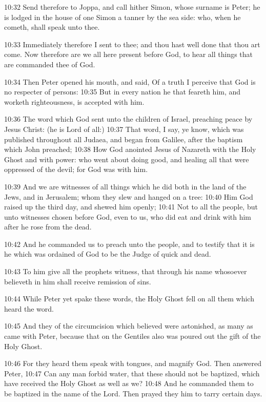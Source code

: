 10:32 Send therefore to Joppa, and call hither Simon, whose surname is Peter; he is lodged in the house of one Simon a tanner by the sea side: who, when he cometh, shall speak unto thee.

10:33 Immediately therefore I sent to thee; and thou hast well done that thou art come. Now therefore are we all here present before God, to hear all things that are commanded thee of God.

10:34 Then Peter opened his mouth, and said, Of a truth I perceive that God is no respecter of persons: 10:35 But in every nation he that feareth him, and worketh righteousness, is accepted with him.

10:36 The word which God sent unto the children of Israel, preaching peace by Jesus Christ: (he is Lord of all:) 10:37 That word, I say, ye know, which was published throughout all Judaea, and began from Galilee, after the baptism which John preached; 10:38 How God anointed Jesus of Nazareth with the Holy Ghost and with power: who went about doing good, and healing all that were oppressed of the devil; for God was with him.

10:39 And we are witnesses of all things which he did both in the land of the Jews, and in Jerusalem; whom they slew and hanged on a tree: 10:40 Him God raised up the third day, and shewed him openly; 10:41 Not to all the people, but unto witnesses chosen before God, even to us, who did eat and drink with him after he rose from the dead.

10:42 And he commanded us to preach unto the people, and to testify that it is he which was ordained of God to be the Judge of quick and dead.

10:43 To him give all the prophets witness, that through his name whosoever believeth in him shall receive remission of sins.

10:44 While Peter yet spake these words, the Holy Ghost fell on all them which heard the word.

10:45 And they of the circumcision which believed were astonished, as many as came with Peter, because that on the Gentiles also was poured out the gift of the Holy Ghost.

10:46 For they heard them speak with tongues, and magnify God. Then answered Peter, 10:47 Can any man forbid water, that these should not be baptized, which have received the Holy Ghost as well as we?  10:48 And he commanded them to be baptized in the name of the Lord. Then prayed they him to tarry certain days.

